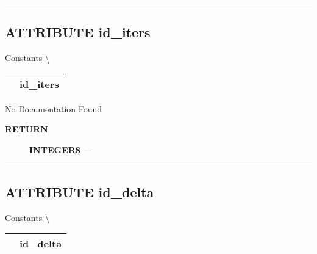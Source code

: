 \rule{\linewidth}{0.5pt}
\subsection*{\textsf{\colorbox{headtoc}{\color{white} ATTRIBUTE}
id\_iters}}

\hypertarget{ecldoc:constants.id_iters}{}
\hspace{0pt} \hyperlink{ecldoc:Constants}{Constants} \textbackslash 

{\renewcommand{\arraystretch}{1.5}
\begin{tabularx}{\textwidth}{|>{\raggedright\arraybackslash}l|X|}
\hline
\hspace{0pt}\mytexttt{\color{red} } & \textbf{id\_iters} \\
\hline
\end{tabularx}
}

\par





No Documentation Found








\par
\begin{description}
\item [\colorbox{tagtype}{\color{white} \textbf{\textsf{RETURN}}}] \textbf{INTEGER8} --- 
\end{description}




\rule{\linewidth}{0.5pt}
\subsection*{\textsf{\colorbox{headtoc}{\color{white} ATTRIBUTE}
id\_delta}}

\hypertarget{ecldoc:constants.id_delta}{}
\hspace{0pt} \hyperlink{ecldoc:Constants}{Constants} \textbackslash 

{\renewcommand{\arraystretch}{1.5}
\begin{tabularx}{\textwidth}{|>{\raggedright\arraybackslash}l|X|}
\hline
\hspace{0pt}\mytexttt{\color{red} } & \textbf{id\_delta} \\
\hline
\end{tabularx}
}

\par





